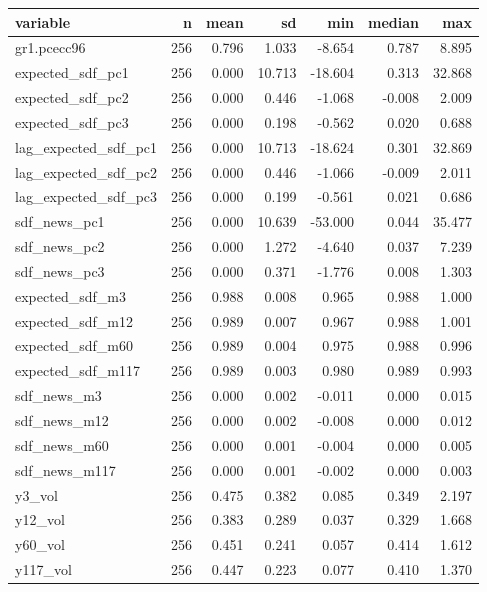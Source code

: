 
\begin{tabular}{lrrrrrr}
\toprule
variable & n & mean & sd & min & median & max\\
\midrule
gr1.pcecc96 & 256 & 0.796 & 1.033 & -8.654 & 0.787 & 8.895\\
expected\_sdf\_pc1 & 256 & 0.000 & 10.713 & -18.604 & 0.313 & 32.868\\
expected\_sdf\_pc2 & 256 & 0.000 & 0.446 & -1.068 & -0.008 & 2.009\\
expected\_sdf\_pc3 & 256 & 0.000 & 0.198 & -0.562 & 0.020 & 0.688\\
lag\_expected\_sdf\_pc1 & 256 & 0.000 & 10.713 & -18.624 & 0.301 & 32.869\\
\addlinespace
lag\_expected\_sdf\_pc2 & 256 & 0.000 & 0.446 & -1.066 & -0.009 & 2.011\\
lag\_expected\_sdf\_pc3 & 256 & 0.000 & 0.199 & -0.561 & 0.021 & 0.686\\
sdf\_news\_pc1 & 256 & 0.000 & 10.639 & -53.000 & 0.044 & 35.477\\
sdf\_news\_pc2 & 256 & 0.000 & 1.272 & -4.640 & 0.037 & 7.239\\
sdf\_news\_pc3 & 256 & 0.000 & 0.371 & -1.776 & 0.008 & 1.303\\
\addlinespace
expected\_sdf\_m3 & 256 & 0.988 & 0.008 & 0.965 & 0.988 & 1.000\\
expected\_sdf\_m12 & 256 & 0.989 & 0.007 & 0.967 & 0.988 & 1.001\\
expected\_sdf\_m60 & 256 & 0.989 & 0.004 & 0.975 & 0.988 & 0.996\\
expected\_sdf\_m117 & 256 & 0.989 & 0.003 & 0.980 & 0.989 & 0.993\\
sdf\_news\_m3 & 256 & 0.000 & 0.002 & -0.011 & 0.000 & 0.015\\
\addlinespace
sdf\_news\_m12 & 256 & 0.000 & 0.002 & -0.008 & 0.000 & 0.012\\
sdf\_news\_m60 & 256 & 0.000 & 0.001 & -0.004 & 0.000 & 0.005\\
sdf\_news\_m117 & 256 & 0.000 & 0.001 & -0.002 & 0.000 & 0.003\\
y3\_vol & 256 & 0.475 & 0.382 & 0.085 & 0.349 & 2.197\\
y12\_vol & 256 & 0.383 & 0.289 & 0.037 & 0.329 & 1.668\\
\addlinespace
y60\_vol & 256 & 0.451 & 0.241 & 0.057 & 0.414 & 1.612\\
y117\_vol & 256 & 0.447 & 0.223 & 0.077 & 0.410 & 1.370\\
\bottomrule
\end{tabular}
